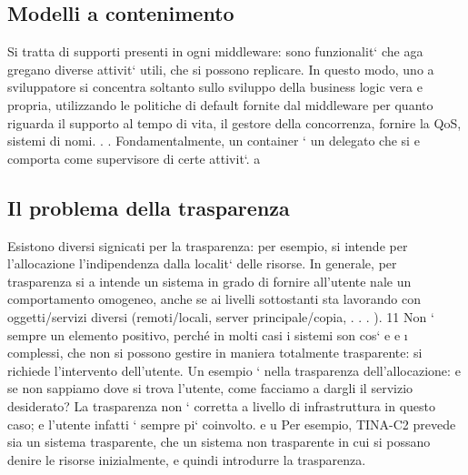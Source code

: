 \documentclass[a4paper,12pt]{article}
\begin{document}
\subsection{Modelli a contenimento}
Si tratta di supporti presenti in ogni middleware: sono funzionalit` che aga
gregano diverse attivit` utili, che si possono replicare. In questo modo, uno
a
sviluppatore si concentra soltanto sullo sviluppo della business logic vera e
propria, utilizzando le politiche di default fornite dal middleware per quanto
riguarda il supporto al tempo di vita, il gestore della concorrenza, fornire la
QoS, sistemi di nomi. . . Fondamentalmente, un container ` un delegato che si
e
comporta come supervisore di certe attivit`.
a
\subsection{Il problema della trasparenza}
Esistono diversi signicati per la trasparenza: per esempio, si intende per l'allocazione l'indipendenza dalla localit`
delle risorse. In generale, per trasparenza si
a
intende un sistema in grado di fornire all'utente nale un comportamento omogeneo, anche se ai livelli sottostanti sta
lavorando con oggetti/servizi diversi
(remoti/locali, server principale/copia, . . . ).
11
Non ` sempre un elemento positivo, perché in molti casi i sistemi son cos`
e
e
\i{}
complessi, che non si possono gestire in maniera totalmente trasparente: si
richiede l'intervento dell'utente. Un esempio ` nella trasparenza dell'allocazione:
e
se non sappiamo dove si trova l'utente, come facciamo a dargli il servizio desiderato? La trasparenza non ` corretta a
livello di infrastruttura in questo caso;
e
l'utente infatti ` sempre pi` coinvolto.
e
u
Per esempio, TINA-C2 prevede sia un sistema trasparente, che un sistema
non trasparente in cui si possano denire le risorse inizialmente, e quindi introdurre la trasparenza.
\end{document}
